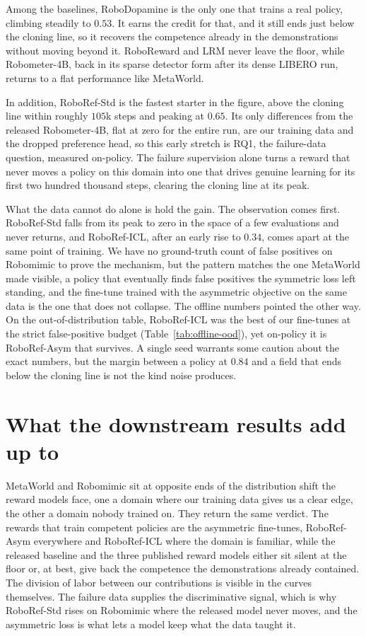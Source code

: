 Among the baselines, RoboDopamine is the only one that trains a real policy, climbing steadily to $0.53$. It earns the credit for that, and it still ends just below the cloning line, so it recovers the competence already in the demonstrations without moving beyond it. RoboReward and LRM never leave the floor, while Robometer-4B, back in its sparse detector form after its dense LIBERO run, returns to a flat performance like MetaWorld.

In addition, RoboRef-Std is the fastest starter in the figure, above the cloning line within roughly $105$k steps and peaking at $0.65$. Its only differences from the released Robometer-4B, flat at zero for the entire run, are our training data and the dropped preference head, so this early stretch is RQ1, the failure-data question, measured on-policy. The failure supervision alone turns a reward that never moves a policy on this domain into one that drives genuine learning for its first two hundred thousand steps, clearing the cloning line at its peak. 

What the data cannot do alone is hold the gain. The observation comes first. RoboRef-Std falls from its peak to zero in the space of a few evaluations and never returns, and RoboRef-ICL, after an early rise to $0.34$, comes apart at the same point of training. We have no ground-truth count of false positives on Robomimic to prove the mechanism, but the pattern matches the one MetaWorld made visible, a policy that eventually finds false positives the symmetric loss left standing, and the fine-tune trained with the asymmetric objective on the same data is the one that does not collapse. The offline numbers pointed the other way. On the out-of-distribution table, RoboRef-ICL was the best of our fine-tunes at the strict false-positive budget (Table~\ref{tab:offline-ood}), yet on-policy it is RoboRef-Asym that survives. A single seed warrants some caution about the exact numbers, but the margin between a policy at $0.84$ and a field that ends below the cloning line is not the kind noise produces.

\section{What the downstream results add up to}
\label{sec:results-rl-summary}

MetaWorld and Robomimic sit at opposite ends of the distribution shift the reward models face, one a domain where our training data gives us a clear edge, the other a domain nobody trained on. They return the same verdict. The rewards that train competent policies are the asymmetric fine-tunes, RoboRef-Asym everywhere and RoboRef-ICL where the domain is familiar, while the released baseline and the three published reward models either sit silent at the floor or, at best, give back the competence the demonstrations already contained. The division of labor between our contributions is visible in the curves themselves. The failure data supplies the discriminative signal, which is why RoboRef-Std rises on Robomimic where the released model never moves, and the asymmetric loss is what lets a model keep what the data taught it.

